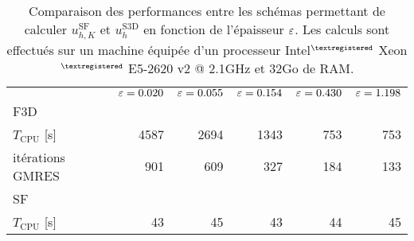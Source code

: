\begin{table}[t]
  \caption{Comparaison des performances entre les schémas permettant
    de calculer $u_{h,K}^{\mathrm{SF}}$ et $u_h^\mathrm{S3D}$ en
    fonction de l'épaisseur $\varepsilon$. Les calculs
    sont effectués sur un machine équipée d'un processeur Intel$^{\tiny{\textregistered}}$ Xeon$^{\tiny{\textregistered}}$
    E5-2620 v2 @ 2.1\si{\giga\hertz} et 32Go de RAM.}
  \label{tab:e-sf-e-s3d-cpu-cost}
  \begin{center}
    \begin{tabular}{@{}lrrrrr@{}}
      \toprule
      & $\varepsilon = 0.020$
      & $\varepsilon = 0.055$
      & $\varepsilon = 0.154$
      & $\varepsilon = 0.430$
      & $\varepsilon = 1.198$ \\
      \cmidrule{2-6}
      F3D  \\
      \hphantom{a} $T_\text{CPU}$ [\si{\second}] & 4587 & 2694 & 1343 & 753 & 753 \\
      \hphantom{a} itérations GMRES           & 901 & 609  & 327  & 184 & 133 \\
      SF \\
      \hphantom{a} $T_\text{CPU}$ [\si{\second}] & 43 & 45   & 43   & 44  & 45  \\
      \bottomrule
    \end{tabular}
  \end{center}
\end{table}
